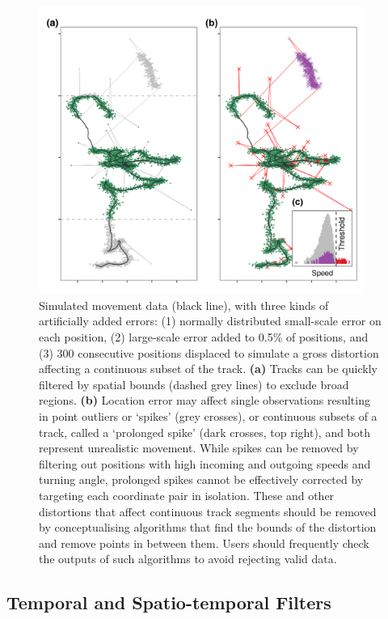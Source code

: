 \documentclass[10pt,paper=a4,headings=standardclasses
]{scrartcl}
\begin{document}
\begin{figure}[h!]
    \centering
    \includegraphics[width=0.95\textwidth]{figures/fig_02_filtering_data.png}
    \caption{Simulated movement data (black line), with three kinds of artificially added errors: (1) normally distributed small-scale error on each position, (2) large-scale error added to 0.5\% of positions, and (3) 300 consecutive positions displaced to simulate a gross distortion affecting a continuous subset of the track.  
    \textbf{(a)} Tracks can be quickly filtered by spatial bounds (dashed grey lines) to exclude broad regions.
    \textbf{(b)} 
    Location error may affect single observations resulting in point outliers or `spikes' (grey crosses), or continuous subsets of a track, called a `prolonged spike' (dark crosses, top right), and both represent unrealistic movement.
    While spikes can be removed by filtering out positions with high incoming and outgoing speeds and turning angle, prolonged spikes cannot be effectively corrected by targeting each coordinate pair in isolation.
    These and other distortions that affect continuous track segments should be removed by conceptualising algorithms that find the bounds of the distortion and remove points in between them.
    Users should frequently check the outputs of such algorithms to avoid rejecting valid data.
    }
    \label{fig:figure_filtering_data}
\end{figure}

\subsection{Temporal and Spatio-temporal Filters}
\end{document}
